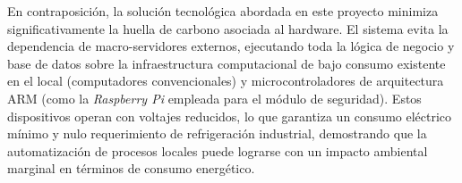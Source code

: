 En contraposición, la solución tecnológica abordada en este proyecto minimiza significativamente la huella de carbono asociada al hardware. El sistema evita la dependencia de macro-servidores externos, ejecutando toda la lógica de negocio y base de datos sobre la infraestructura computacional de bajo consumo existente en el local (computadores convencionales) y microcontroladores de arquitectura ARM (como la \textit{Raspberry Pi} empleada para el módulo de seguridad). Estos dispositivos operan con voltajes reducidos, lo que garantiza un consumo eléctrico mínimo y nulo requerimiento de refrigeración industrial, demostrando que la automatización de procesos locales puede lograrse con un impacto ambiental marginal en términos de consumo energético.
